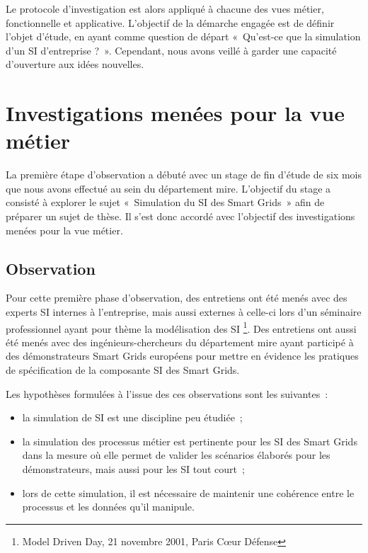 Le protocole d'investigation est alors appliqué à chacune des vues métier, 
fonctionnelle et applicative. L'objectif de la démarche engagée est de définir 
l'objet d'étude, en ayant comme question de départ «~Qu'est-ce que la simulation 
d'un SI d'entreprise ?~». Cependant, nous avons veillé à garder une capacité 
d'ouverture aux idées nouvelles. %
	
\section{Investigations menées pour la vue métier}
\label{sec:exploration_metier}
La première étape d'observation a débuté avec un stage de fin d'étude de six 
mois que nous avons effectué au sein du département \gls{mire}. L'objectif du 
stage a consisté à explorer le sujet «~Simulation du SI des Smart Grids~» afin 
de préparer un sujet de thèse. Il s'est donc accordé avec l'objectif des 
investigations menées pour la vue métier.
			
\subsection{Observation}
Pour cette première phase d'observation, des entretiens ont été menés avec 
des experts SI internes à l'entreprise, mais aussi externes à celle-ci lors 
d'un séminaire professionnel ayant pour thème la modélisation des SI \footnote{Model Driven Day, 21 novembre 2001, Paris 
Cœur Défense}. Des entretiens ont aussi été menés avec des ingénieurs-chercheurs 
du département \gls{mire} ayant participé à des démonstrateurs Smart Grids 
européens pour mettre en évidence les pratiques de spécification de la 
composante SI des Smart Grids. 

Les hypothèses formulées à l'issue des ces observations sont les suivantes~:
\begin{itemize}
    \item la simulation de SI est une discipline peu étudiée~;
	\item la simulation des processus métier est pertinente pour les SI des 
Smart Grids dans la mesure où elle permet de valider les scénarios élaborés pour 
les démonstrateurs, mais aussi pour les SI tout court~;
	\item lors de cette simulation, il est nécessaire de maintenir une 
cohérence entre le processus et les données qu'il manipule.
\end{itemize}
		
